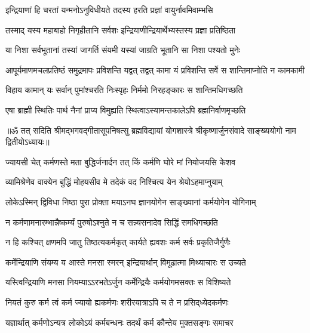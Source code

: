 \twolineshloka
{इन्द्रियाणां हि चरतां यन्मनोऽनुविधीयते}
{तदस्य हरति प्रज्ञां वायुर्नावमिवाम्भसि}%

\twolineshloka
{तस्माद् यस्य महाबाहो निगृहीतानि सर्वशः}
{इन्द्रियाणीन्द्रियार्थेभ्यस्तस्य प्रज्ञा प्रतिष्ठिता}%

\twolineshloka
{या निशा सर्वभूतानां तस्यां जागर्ति संयमी}
{यस्यां जाग्रति भूतानि सा निशा पश्यतो मुनेः}%

\fourlineindentedshloka
{आपूर्यमाणमचलप्रतिष्ठं}
{समुद्रमापः प्रविशन्ति यद्वत्}
{तद्वत् कामा यं प्रविशन्ति सर्वे}
{स शान्तिमाप्नोति न कामकामी}%

\twolineshloka
{विहाय कामान् यः  सर्वान् पुमांश्चरति निःस्पृहः}
{निर्ममो निरहङ्कारः स शान्तिमधिगच्छति}%

\twolineshloka
{एषा ब्राह्मी स्थितिः पार्थ नैनां प्राप्य विमुह्यति}
{स्थित्वाऽस्यामन्तकालेऽपि ब्रह्मनिर्वाणमृच्छति}%

{॥ॐ तत् सदिति श्रीमद्भगवद्गीतासूपनिषत्सु ब्रह्मविद्यायां योगशास्त्रे श्रीकृष्णार्जुनसंवादे साङ्ख्ययोगो नाम द्वितीयोऽध्यायः॥}



\twolineshloka
{ज्यायसी चेत् कर्मणस्ते मता बुद्धिर्जनार्दन}
{तत् किं कर्मणि घोरे मां नियोजयसि केशव}%

\twolineshloka
{व्यामिश्रेणेव वाक्येन बुद्धिं मोहयसीव मे}
{तदेकं वद निश्चित्य येन श्रेयोऽहमाप्नुयाम्}%


\twolineshloka
{लोकेऽस्मिन् द्विविधा निष्ठा पुरा प्रोक्ता मयाऽनघ}
{ज्ञानयोगेन साङ्ख्यानां कर्मयोगेन योगिनाम्}%

\twolineshloka
{न कर्मणामनारम्भान्नैष्कर्म्यं पुरुषोऽश्नुते}
{न च सन्न्यसनादेव सिद्धिं समधिगच्छति}%

\twolineshloka
{न हि कश्चित् क्षणमपि जातु तिष्ठत्यकर्मकृत्}
{कार्यते ह्यवशः कर्म सर्वः प्रकृतिजैर्गुणैः}%

\twolineshloka
{कर्मेन्द्रियाणि संयम्य य आस्ते मनसा स्मरन्}
{इन्द्रियार्थान् विमूढात्मा मिथ्याचारः स उच्यते}%

\twolineshloka
{यस्त्विन्द्रियाणि मनसा नियम्याऽऽरभतेऽर्जुन}
{कर्मेन्द्रियैः कर्मयोगमसक्तः स विशिष्यते}%

\twolineshloka
{नियतं कुरु कर्म त्वं कर्म ज्यायो ह्यकर्मणः}
{शरीरयात्राऽपि च ते न प्रसिद्‌ध्येदकर्मणः}%

\twolineshloka
{यज्ञार्थात् कर्मणोऽन्यत्र लोकोऽयं कर्मबन्धनः}
{तदर्थं कर्म कौन्तेय मुक्तसङ्गः समाचर}%

